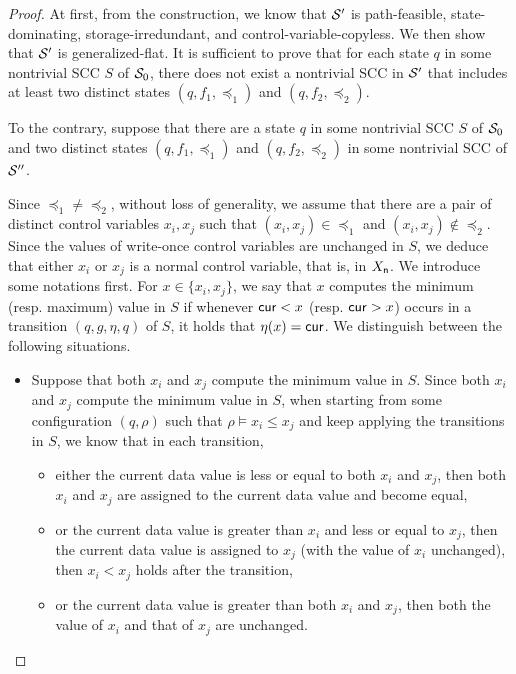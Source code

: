 \begin{appendix}
{\begin{proof}
At first, from the construction, we know that ${\mathcal{S} }'$ is path-feasible, state-dominating, storage-irredundant, and control-variable-copyless. We then show that ${\mathcal{S} }'$ is generalized-flat. It is sufficient to prove that for each state $q$ in some nontrivial SCC $S$ of ${\mathcal{S} }_0$, there does not exist a nontrivial SCC in ${\mathcal{S} }'$ that includes at least two distinct states $(q, f_1, \preceq_1)$ and $(q, f_2, \preceq_2)$.

To the contrary, suppose that there are a state $q$ in some nontrivial SCC $S$ of ${\mathcal{S} }_0$ and two distinct states $(q, f_1, \preceq_1)$ and $(q, f_2, \preceq_2)$ in some nontrivial SCC of ${\mathcal{S} }''$.

Since $\preceq_1 \neq \preceq_2$, without loss of generality, we assume that there are a pair of distinct control variables $x_i, x_j$ such that $(x_i, x_j) \in \preceq_1$ and $(x_i, x_j) \not \in \preceq_2$. Since the values of write-once control variables are unchanged in $S$, we deduce that either $x_i$ or $x_j$ is a normal control variable, that is,  in $X_{\sf n}$.
We introduce some notations first. For $x \in \{x_i, x_j\}$, we say that $x$ computes the minimum (resp. maximum) value in $S$ if whenever $\mathsf{cur} < x$ (resp. $\mathsf{cur} > x$) occurs in a transition $(q, g, \eta, q)$ of $S$, it holds that $\eta(x)=\mathsf{cur}$. 
We distinguish between the following situations.
\begin{itemize}
\item Suppose that both $x_i$ and $x_j$ compute the minimum value in $S$. Since both $x_i$ and $x_j$ compute the minimum value in $S$, when starting from some configuration $(q, \rho)$ such that $\rho \models x_i \le x_j$ and keep applying the transitions in $S$, we know that in each transition, 
\begin{itemize}
\item either the current data value is less or equal to both $x_i$ and $x_j$, then both $x_i$ and $x_j$ are assigned to the current data value and become equal, 
%
\item or the current data value is greater than $x_i$ and less or equal to $x_j$, then the current data value is assigned to $x_j$ (with the value of $x_i$ unchanged), then $x_i < x_j$ holds after the transition,
%
\item or the current data value is greater than both $x_i$ and $x_j$, then both the value of $x_i$ and that of $x_j$ are unchanged.
\end{itemize}

\end{itemize}
\end{proof}}
\end{appendix}
